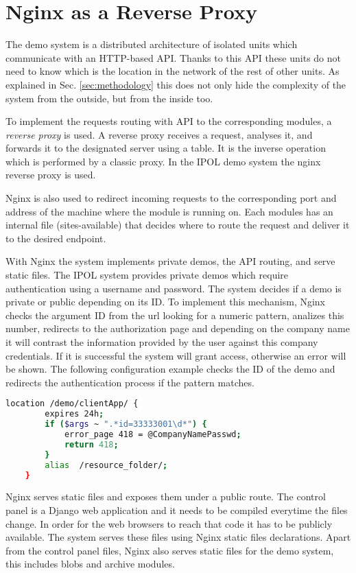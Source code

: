 
\section{Nginx as a Reverse Proxy}
\label{sec:reverse_proxy}

The demo system is a distributed architecture of isolated units which communicate with an HTTP-based API. Thanks to this API these
units do not need to know which is the location in the network of the rest of other units. As explained in Sec. \ref{sec:methodology} this
does not only hide the complexity of the system from the outside, but from the inside too.

To implement the requests routing with API to the corresponding modules, a \emph{reverse proxy} is used. A reverse proxy receives a
request, analyses it, and forwards it to the designated server using a table. It is the inverse operation which is performed by a
classic proxy. In the IPOL demo system the nginx reverse proxy is used.

Nginx is also used to redirect incoming requests to the corresponding port and address of the machine where the module is 
running on. Each modules has an internal file (sites-available) that decides where to route the request and deliver it to the desired endpoint.

With Nginx the system implements private demos, the API routing, and serve static files. The IPOL system provides private demos which require
authentication using a username and password. The system decides if a demo is private or public depending on its ID. To implement this
mechanism, Nginx checks the argument ID from the url looking for a numeric pattern, analizes this number, redirects to the authorization
page and depending on the company name it will contrast the information provided by the user against this company credentials. If it
is successful the system will grant access, otherwise an error will be shown. The following configuration example checks the ID of the
demo and redirects the authentication process if the pattern matches. 

\begin{lstlisting}[language=Bash]
location /demo/clientApp/ {
        expires 24h;
        if ($args ~ ".*id=33333001\d*") {
            error_page 418 = @CompanyNamePasswd;
            return 418;
        }
        alias  /resource_folder/;
    }
 \end{lstlisting}


Nginx serves static files and exposes them under a public route. The control panel is a Django web application and it needs to be compiled 
everytime the files change. In order for the web browsers to reach that code it has to be publicly available. The system serves these
files using Nginx static files declarations. Apart from the control panel files, Nginx also serves static files for the demo system, this includes
blobs and archive modules.